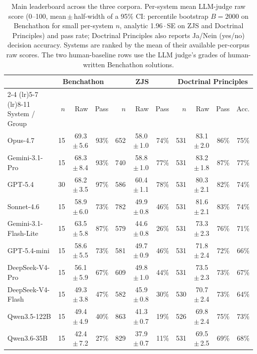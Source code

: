 \documentclass[11pt]{article}
\begin{document}
\begin{table}[t]
\centering\footnotesize
\caption{Main leaderboard across the three corpora. Per-system mean LLM-judge raw score (0--100, mean\,$\pm$\,half-width of a 95\% CI: percentile bootstrap $B=2000$ on Benchathon for small per-system $n$, analytic 1.96\,$\cdot$\,SE on ZJS and Doctrinal Principles) and pass rate; Doctrinal Principles also reports Ja/Nein (yes/no) decision accuracy. Systems are ranked by the mean of their available per-corpus raw scores. The two human-baseline rows use the LLM judge's grades of human-written Benchathon solutions.}
\label{tbl-main-leaderboard}
\setlength{\tabcolsep}{4pt}
\begin{tabular*}{\textwidth}{@{\extracolsep{\fill}} l rrr rrr rrrr @{}}
\toprule
 & \multicolumn{3}{c}{Benchathon} & \multicolumn{3}{c}{ZJS} & \multicolumn{4}{c}{Doctrinal Principles} \\
\cmidrule(lr){2-4} \cmidrule(lr){5-7} \cmidrule(lr){8-11}
System / Group & $n$ & Raw & Pass & $n$ & Raw & Pass & $n$ & Raw & Pass & Acc. \\
\midrule
Opus-4.7 & 15 & 69.3\,$\pm$\,5.6 & 93\% & 652 & 58.0\,$\pm$\,1.0 & 74\% & 531 & 83.1\,$\pm$\,2.0 & 86\% & 75\% \\
Gemini-3.1-Pro & 15 & 68.3\,$\pm$\,8.4 & 93\% & 740 & 58.8\,$\pm$\,1.0 & 77\% & 531 & 83.2\,$\pm$\,1.8 & 87\% & 77\% \\
GPT-5.4 & 30 & 68.2\,$\pm$\,3.5 & 97\% & 586 & 60.4\,$\pm$\,1.1 & 78\% & 531 & 80.3\,$\pm$\,2.1 & 82\% & 74\% \\
Sonnet-4.6 & 15 & 58.9\,$\pm$\,6.0 & 73\% & 782 & 49.9\,$\pm$\,0.8 & 46\% & 531 & 81.6\,$\pm$\,2.1 & 83\% & 74\% \\
Gemini-3.1-Flash-Lite & 15 & 63.5\,$\pm$\,5.8 & 87\% & 579 & 44.6\,$\pm$\,0.8 & 26\% & 531 & 73.3\,$\pm$\,2.3 & 76\% & 71\% \\
GPT-5.4-mini & 15 & 58.6\,$\pm$\,5.5 & 73\% & 581 & 49.7\,$\pm$\,0.9 & 46\% & 531 & 71.8\,$\pm$\,2.4 & 72\% & 66\% \\
DeepSeek-V4-Pro & 15 & 56.1\,$\pm$\,5.9 & 67\% & 609 & 49.8\,$\pm$\,1.0 & 44\% & 531 & 73.5\,$\pm$\,2.3 & 73\% & 67\% \\
DeepSeek-V4-Flash & 15 & 49.3\,$\pm$\,3.8 & 47\% & 582 & 45.9\,$\pm$\,0.8 & 30\% & 530 & 70.7\,$\pm$\,2.4 & 73\% & 64\% \\
Qwen3.5-122B & 15 & 49.4\,$\pm$\,4.9 & 40\% & 863 & 41.3\,$\pm$\,0.7 & 19\% & 526 & 69.8\,$\pm$\,2.4 & 75\% & 73\% \\
Qwen3.6-35B & 15 & 42.4\,$\pm$\,7.2 & 27\% & 829 & 37.9\,$\pm$\,0.7 & 11\% & 531 & 69.5\,$\pm$\,2.5 & 69\% & 68\% \\

\end{tabular*}
\end{table}
\end{document}
